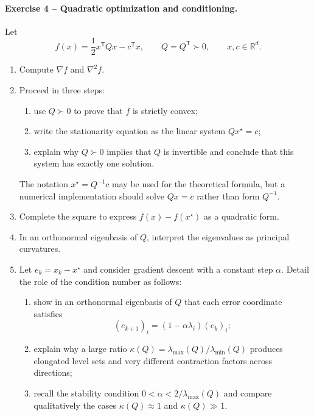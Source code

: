 \documentclass[10pt]{article}
\newcommand{\R}{\mathbb{R}}
\newcommand{\trans}{^{\mathsf T}}
\begin{document}
\paragraph{Exercise 4 -- Quadratic optimization and conditioning.}
Let
\[
f(x)=\frac12x\trans Qx-c\trans x,\qquad
Q=Q\trans\succ0,\qquad x,c\in\R^d.
\]
\begin{enumerate}
\item Compute $\nabla f$ and $\nabla^2f$.
\item Proceed in three steps:
\begin{enumerate}[label=(\alph*)]
  \item use $Q\succ0$ to prove that $f$ is strictly convex;
  \item write the stationarity equation as the linear system
  $Qx^\star=c$;
  \item explain why $Q\succ0$ implies that $Q$ is invertible and conclude that
  this system has exactly one solution.
\end{enumerate}
The notation $x^\star=Q^{-1}c$ may be used for the theoretical formula, but a
numerical implementation should solve $Qx=c$ rather than form $Q^{-1}$.
\item Complete the square to express $f(x)-f(x^\star)$ as a quadratic form.
\item In an orthonormal eigenbasis of $Q$, interpret the eigenvalues as
principal curvatures.
\item Let $e_k=x_k-x^\star$ and consider gradient descent with a constant step
$\alpha$. Detail the role of the condition number as follows:
\begin{enumerate}[label=(\alph*)]
  \item show in an orthonormal eigenbasis of $Q$ that each error coordinate
  satisfies
  \[
    (e_{k+1})_i=(1-\alpha\lambda_i)(e_k)_i;
  \]
  \item explain why a large ratio
  $\kappa(Q)=\lambda_{\max}(Q)/\lambda_{\min}(Q)$ produces elongated level
  sets and very different contraction factors across directions;
  \item recall the stability condition $0<\alpha<2/\lambda_{\max}(Q)$ and
  compare qualitatively the cases $\kappa(Q)\approx1$ and
  $\kappa(Q)\gg1$.
\end{enumerate}
\end{enumerate}
\end{document}
